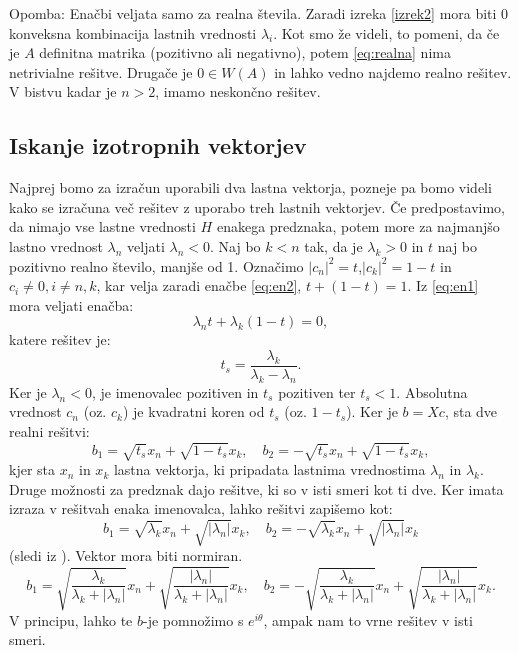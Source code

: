 \documentclass[12pt,a4paper]{amsart}
\theoremstyle{definition}
\theoremstyle{plain}
\newcommand{\abs}[1]{ \left\lvert#1\right\rvert}
\begin{document}
Opomba: Enačbi veljata samo za realna števila. Zaradi  izreka \ref{izrek2} mora biti 0 konveksna kombinacija lastnih vrednosti $\lambda_i$. Kot smo že videli, to pomeni, da če je $A$ definitna matrika (pozitivno ali negativno), potem \eqref{eq:realna}
nima netrivialne rešitve. Drugače je $0 \in W(A)$ in lahko vedno najdemo realno rešitev. V bistvu kadar je $n>2$,  imamo neskončno rešitev. 
\subsection{Iskanje izotropnih vektorjev}
Najprej bomo za izračun uporabili dva lastna vektorja, pozneje pa bomo videli kako se izračuna več rešitev z uporabo treh lastnih vektorjev. Če predpostavimo, da nimajo vse lastne vrednosti $H$ enakega predznaka, potem more za najmanjšo lastno vrednost $\lambda_n$ veljati $\lambda_n <0$. 
 Naj bo $k<n$ tak, da je $\lambda_k >0$ in $t$ naj bo pozitivno realno število, manjše od 1.  Označimo $\abs{c_n}^2 =t$,$\abs{c_k}^2=1-t$ in $c_i \not =0, i\not=n,k$, kar velja zaradi enačbe \eqref{eq:en2}, $t+ (1-t)=1$. Iz \eqref{eq:en1} mora veljati enačba: $$\lambda_n t +\lambda_k (1-t)=0,$$ katere rešitev je:
\begin{equation}
t_s=\frac{\lambda_k}{\lambda_k -\lambda_n}.
\end{equation}
Ker je $\lambda_n <0$, je imenovalec pozitiven in $t_s$ pozitiven ter $t_s <1$. Absolutna vrednost $c_n$ (oz. $c_k$) je kvadratni koren od $t_s$ (oz. $1-t_s$). Ker je $b=Xc$, sta dve realni rešitvi: $$b_1=\sqrt{t_s}x_n +\sqrt{1-t_s}x_k,\quad b_2=-\sqrt{t_s}x_n+\sqrt{1-t_s}x_k,$$ kjer sta $x_n$ in $x_k$ lastna vektorja, ki pripadata lastnima vrednostima $\lambda_n$ in $\lambda_k$. Druge možnosti za predznak dajo rešitve, ki so v isti smeri kot ti dve. Ker imata izraza v rešitvah enaka imenovalca, lahko rešitvi zapišemo kot: $$b_1=\sqrt{\lambda_k}x_n+\sqrt{\abs{\lambda_n}}x_k, \quad b_2=-\sqrt{\lambda_k}x_n+\sqrt{\abs{\lambda_n}}x_k$$(sledi iz \cite{lipkin}).  Vektor mora biti normiran.
 $$b_1=\sqrt{\frac{\lambda_k}{\lambda_k +\abs{\lambda_n}}}x_n + \sqrt{\frac{\abs{\lambda_n}}{\lambda_k +\abs{\lambda_n}}}x_k,\quad b_2=-\sqrt{\frac{\lambda_k}{\lambda_k +\abs{\lambda_n}}}x_n + \sqrt{\frac{\abs{\lambda_n}}{\lambda_k +\abs{\lambda_n}}}x_k.$$ V principu, lahko te $b$-je pomnožimo s $e^{i\theta}$, ampak nam to vrne rešitev v isti smeri. 
\end{document}
